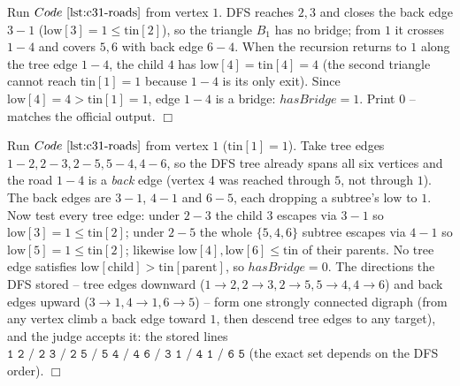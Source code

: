 \begin{tracebox}
Run \(\coderef{c31-roads}\) from vertex \(1\).  DFS reaches \(2,3\) and closes the back edge
\(3\!-\!1\) (\(\mathrm{low}[3]{=}1\le \mathrm{tin}[2]\)), so the triangle \(B_1\) has no
bridge; from \(1\) it crosses \(1\!-\!4\) and covers \(5,6\) with back edge \(6\!-\!4\).  When
the recursion returns to \(1\) along the tree edge \(1\!-\!4\), the child \(4\) has
\(\mathrm{low}[4]=\mathrm{tin}[4]=4\) (the second triangle cannot reach \(\mathrm{tin}[1]=1\)
because \(1\!-\!4\) is its only exit).  Since \(\mathrm{low}[4]=4>\mathrm{tin}[1]=1\), edge
\(1\!-\!4\) is a bridge: \(\mathit{hasBridge}=1\).  Print \(\boxed{0}\) -- matches the official
output.  \(\Box\)
\end{tracebox}
\begin{tracebox}
Run \(\coderef{c31-roads}\) from vertex \(1\) (\(\mathrm{tin}[1]{=}1\)).  Take tree edges
\(1\!-\!2,2\!-\!3,2\!-\!5,5\!-\!4,4\!-\!6\), so the DFS tree already spans all six vertices
and the road \(1\!-\!4\) is a \emph{back} edge (vertex \(4\) was reached through \(5\), not
through \(1\)).  The back edges are \(3\!-\!1\), \(4\!-\!1\) and \(6\!-\!5\), each dropping a
subtree's \(\mathrm{low}\) to \(1\).  Now test every tree edge: under \(2\!-\!3\) the child
\(3\) escapes via \(3\!-\!1\) so \(\mathrm{low}[3]{=}1\le\mathrm{tin}[2]\); under
\(2\!-\!5\) the whole \(\{5,4,6\}\) subtree escapes via \(4\!-\!1\) so \(\mathrm{low}[5]{=}1
\le\mathrm{tin}[2]\); likewise \(\mathrm{low}[4],\mathrm{low}[6]\le\mathrm{tin}\) of their
parents.  No tree edge satisfies \(\mathrm{low}[\text{child}]>\mathrm{tin}[\text{parent}]\),
so \(\mathit{hasBridge}=0\).  The directions the DFS stored -- tree edges downward
(\(1\!\to\!2,2\!\to\!3,2\!\to\!5,5\!\to\!4,4\!\to\!6\)) and back edges upward
(\(3\!\to\!1,4\!\to\!1,6\!\to\!5\)) -- form one strongly connected digraph (from any vertex
climb a back edge toward \(1\), then descend tree edges to any target), and the judge accepts
it: the stored lines \(\boxed{\texttt{1 2 / 2 3 / 2 5 / 5 4 / 4 6 / 3 1 / 4 1 / 6 5}}\) (the
exact set depends on the DFS order). \(\Box\)
\end{tracebox}

